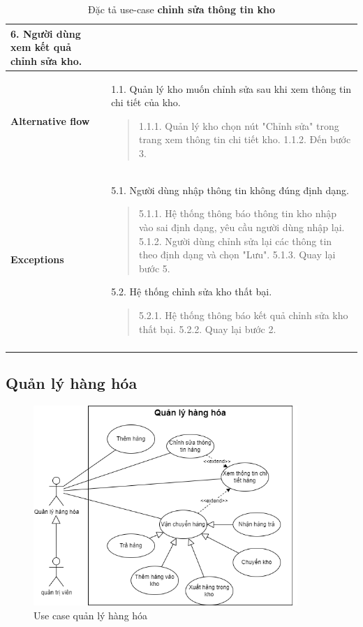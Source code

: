 {\begin{longtable}{| p{} | p{} |}
        6. Người dùng xem kết quả chỉnh sửa kho.
        \\
        \hline
        \begin{flushleft}
            \textbf{Alternative flow}
        \end{flushleft}
         &
        1.1. Quản lý kho muốn chỉnh sửa sau khi xem thông tin chi tiết của kho.
        \begin{quote}
            1.1.1. Quản lý kho chọn nút "Chỉnh sửa" trong trang xem thông tin chi tiết kho.
            1.1.2. Đến bước 3.
        \end{quote}
        \\
        \hline
        \begin{flushleft}
            \textbf{Exceptions}
        \end{flushleft}
         &
        5.1. Người dùng nhập thông tin không đúng định dạng.
        \begin{quote}
            5.1.1. Hệ thống thông báo thông tin kho nhập vào sai định dạng, yêu cầu người dùng nhập lại.
            5.1.2. Người dùng chỉnh sửa lại các thông tin theo định dạng và chọn "Lưu".
            5.1.3. Quay lại bước 5.
        \end{quote}
        5.2. Hệ thống chỉnh sửa kho thất bại.
        \begin{quote}
            5.2.1. Hệ thống thông báo kết quả chỉnh sửa kho thất bại.
            5.2.2. Quay lại bước 2.
        \end{quote}
        \\
        \hline
        \caption{Đặc tả use-case \textbf{chỉnh sửa thông tin kho}}
    \end{longtable}
}


\subsection{Quản lý hàng hóa}
\begin{figure}[!htp]
    \centering
    \includegraphics[width=10cm]{img/UseCase/UseCase-Quản lý hàng.drawio.png}
    \newline
    \caption{Use case quản lý hàng hóa}
\end{figure}


